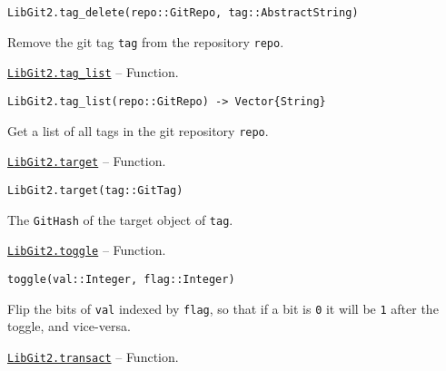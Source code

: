 \begin{adjustwidth}{2em}{0pt}


\begin{verbatim}
LibGit2.tag_delete(repo::GitRepo, tag::AbstractString)
\end{verbatim}

Remove the git tag \texttt{tag} from the repository \texttt{repo}.



\end{adjustwidth}
\hypertarget{7061472492129884254}{}
\hyperlink{7061472492129884254}{\texttt{LibGit2.tag\_list}}  -- {Function.}

\begin{adjustwidth}{2em}{0pt}


\begin{verbatim}
LibGit2.tag_list(repo::GitRepo) -> Vector{String}
\end{verbatim}

Get a list of all tags in the git repository \texttt{repo}.



\end{adjustwidth}
\hypertarget{14775566063016633781}{}
\hyperlink{14775566063016633781}{\texttt{LibGit2.target}}  -- {Function.}

\begin{adjustwidth}{2em}{0pt}


\begin{verbatim}
LibGit2.target(tag::GitTag)
\end{verbatim}

The \texttt{GitHash} of the target object of \texttt{tag}.



\end{adjustwidth}
\hypertarget{6271025014547744112}{}
\hyperlink{6271025014547744112}{\texttt{LibGit2.toggle}}  -- {Function.}

\begin{adjustwidth}{2em}{0pt}


\begin{verbatim}
toggle(val::Integer, flag::Integer)
\end{verbatim}

Flip the bits of \texttt{val} indexed by \texttt{flag}, so that if a bit is \texttt{0} it will be \texttt{1} after the toggle, and vice-versa.



\end{adjustwidth}
\hypertarget{11557958455666787225}{}
\hyperlink{11557958455666787225}{\texttt{LibGit2.transact}}  -- {Function.}

